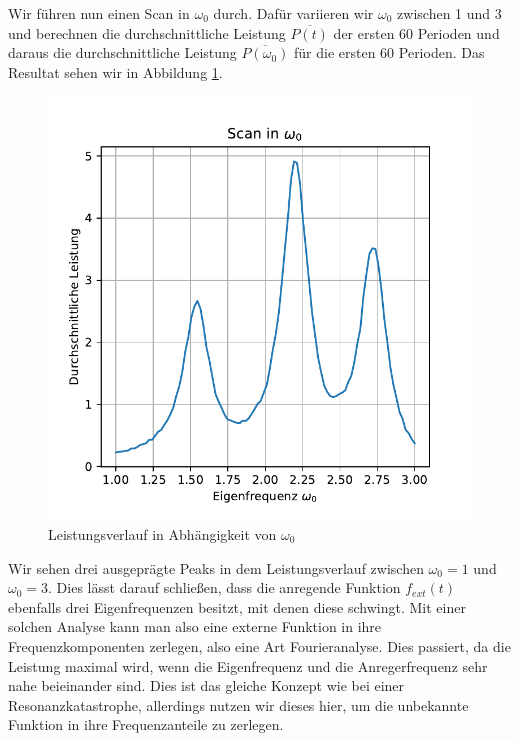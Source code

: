 \documentclass[12pt,a4paper]{article}
\begin{document}
Wir führen nun einen Scan in $\omega_0$ durch. Dafür variieren wir $\omega_0$ zwischen 1 und 3 und berechnen die durchschnittliche Leistung $\overline{P(t)}$ der ersten 60 Perioden und daraus die durchschnittliche Leistung $\overline{P(\omega_0)}$ für die ersten 60 Perioden. Das Resultat sehen wir in Abbildung \ref{f:power_scan}.
\begin{figure}
	\includegraphics{Scan_Omega_Power.pdf}
	\caption{Leistungsverlauf in Abhängigkeit von $\omega_0$}\label{f:power_scan}
\end{figure}
Wir sehen drei ausgeprägte Peaks in dem Leistungsverlauf zwischen $\omega_0=1$ und $\omega_0=3$. Dies lässt darauf schließen, dass die anregende Funktion $f_{ext}(t)$ ebenfalls drei Eigenfrequenzen besitzt, mit denen diese schwingt. Mit einer solchen Analyse kann man also eine externe Funktion in ihre Frequenzkomponenten zerlegen, also eine Art Fourieranalyse. Dies passiert, da die Leistung maximal wird, wenn die Eigenfrequenz und die Anregerfrequenz sehr nahe beieinander sind. Dies ist das gleiche Konzept wie bei einer Resonanzkatastrophe, allerdings nutzen wir dieses hier, um die unbekannte Funktion in ihre Frequenzanteile zu zerlegen.
\newpage
\listoffigures
\end{document}
